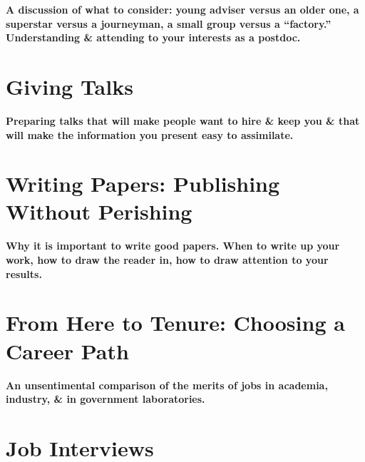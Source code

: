 \documentclass{article}
\numberwithin{equation}{section}
\begin{document}
\begin{center}
	\textsf{\bf A discussion of what to consider: young adviser versus an older one, a superstar versus a journeyman, a small group versus a ``factory.'' Understanding \& attending to your interests as a postdoc.}
\end{center}


\section{Giving Talks}

\begin{center}
	\textsf{\bf Preparing talks that will make people want to hire \& keep you \& that will make the information you present easy to assimilate.}
\end{center}


\section{Writing Papers: Publishing Without Perishing}

\begin{center}
	\textsf{\bf Why it is important to write good papers. When to write up your work, how to draw the reader in, how to draw attention to your results.}
\end{center}


\section{From Here to Tenure: Choosing a Career Path}

\begin{center}
	\textsf{\bf An unsentimental comparison of the merits of jobs in academia, industry, \& in government laboratories.}
\end{center}


\section{Job Interviews}
\end{document}
